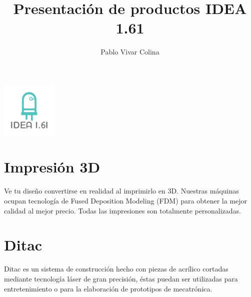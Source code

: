 \documentclass[]{article}
\title{Presentación de productos IDEA 1.61}
\author{Pablo Vivar Colina}
\begin{document}
% 

\maketitle

\begin{center}
	\includegraphics[width=0.2\textwidth]{idea.png}
\end{center}


\section{Impresión 3D}

Ve tu diseño convertirse en realidad al imprimirlo en 3D. Nuestras máquinas ocupan tecnología de Fused Deposition Modeling (FDM) para obtener la mejor calidad al mejor precio. Todas las impresiones son totalmente personalizadas.\\

\section{Ditac}

Ditac es un sistema de construcción hecho con piezas de acrílico cortadas mediante tecnología láser de gran precisión, éstas puedan ser utilizadas para entretenimiento o para la elaboración de prototipos de mecatrónica.\\
\end{document}
